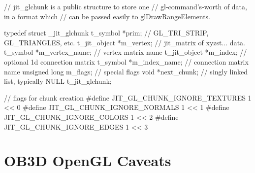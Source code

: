 \begin{DoxyCode}
// jit_glchunk is a public structure to store one 
// gl-command's-worth of data, in a format which 
// can be passed easily to glDrawRangeElements.  

typedef struct _jit_glchunk
{
   t_symbol   *prim;         // GL_TRI_STRIP, GL_TRIANGLES, etc. 
   t_jit_object *m_vertex;      // jit_matrix of xyzst... data. 
   t_symbol    *m_vertex_name;   // vertex matrix name
   t_jit_object *m_index;      // optional 1d connection matrix
   t_symbol    *m_index_name;   // connection matrix name
   unsigned long m_flags;      // special flags
   void      *next_chunk;      // singly linked list, typically NULL
} t_jit_glchunk;

// flags for chunk creation
#define JIT_GL_CHUNK_IGNORE_TEXTURES      1 << 0
#define JIT_GL_CHUNK_IGNORE_NORMALS      1 << 1
#define JIT_GL_CHUNK_IGNORE_COLORS      1 << 2
#define JIT_GL_CHUNK_IGNORE_EDGES      1 << 3
\end{DoxyCode}
\hypertarget{chapter_jit_ob3ddetails_chapter_jit_ob3ddetails_caveats}{}\section{OB3D OpenGL Caveats}\label{chapter_jit_ob3ddetails_chapter_jit_ob3ddetails_caveats}
